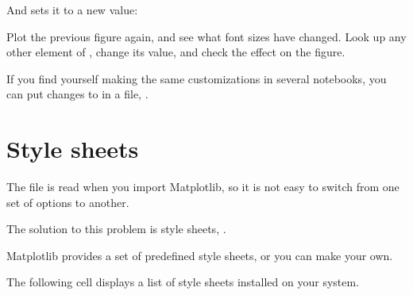 \documentclass[letterpaper,10pt,english]{sphinxmanual}
\begin{document}
And sets it to a new value:

\begin{sphinxVerbatim}[commandchars=\\\{\}]
\PYG{p}{[}\PYG{p}{]}  
\end{sphinxVerbatim}

 Plot the previous figure again, and see what font sizes have changed.  Look up any other element of , change its value, and check the effect on the figure.

If you find yourself making the same customizations in several notebooks, you can put changes to  in a  file, .


\section{Style sheets}
\label{\detokenize{07_plot:style-sheets}}
The  file is read when you import Matplotlib, so it is not easy to switch from one set of options to another.

The solution to this problem is style sheets, .

Matplotlib provides a set of predefined style sheets, or you can make your own.

The following cell displays a list of style sheets installed on your system.

\begin{sphinxVerbatim}[commandchars=\\\{\}]
\end{sphinxVerbatim}
\end{document}
